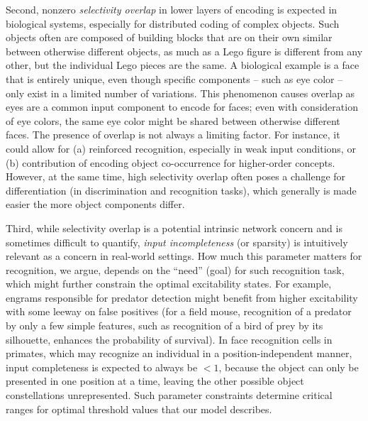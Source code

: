 Second, nonzero \textit{selectivity overlap} in lower layers of encoding
        is expected in biological systems,
        especially for distributed coding of complex objects.
    Such objects often are composed of building blocks
        that are on their own similar between otherwise different objects,
        as much as a Lego figure is different from any other,
        but the individual Lego pieces are the same.
    A biological example is a face that is entirely unique,
        even though specific components -- such as eye color --
            only exist in a limited number of variations.
    This phenomenon causes overlap
            as eyes are a common input component to encode for faces;
        even with consideration of eye colors,
            the same eye color might be shared between otherwise different faces.
    The presence of overlap is not always a limiting factor.
    For instance, it could allow for
        (a) reinforced recognition, especially in weak input conditions,
        or (b) contribution of encoding object co-occurrence for higher-order concepts.
    However, at the same time, high selectivity overlap
        often poses a challenge for differentiation
            (in discrimination and recognition tasks),
        which generally is made easier the more object components differ.

Third, while selectivity overlap is a potential intrinsic network concern
        and is sometimes difficult to quantify,
        \textit{input incompleteness} (or sparsity) is intuitively relevant
            as a concern in real-world settings.
    How much this parameter matters for recognition, we argue,
        depends on the ``need'' (goal) for such recognition task,
        which might further constrain the optimal excitability states.
    For example, engrams responsible for predator detection might benefit from
        higher excitability with some leeway on false positives
        (for a field mouse,
            recognition of a predator by only a few simple features,
                such as recognition of a bird of prey by its silhouette,
            enhances the probability of survival).
    In face recognition cells in primates,
        which may recognize an individual in a position-independent manner,
        input completeness is expected to always be $< 1$,
        because the object can only be presented in one position at a time,
        leaving the other possible object constellations unrepresented.
    Such parameter constraints determine critical ranges
        for optimal threshold values that our model describes.

